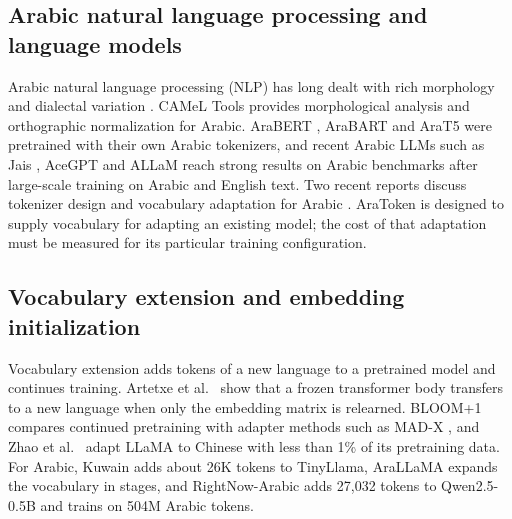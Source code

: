 \documentclass{ieeeaccess}
\begin{document}
\subsection{Arabic natural language processing and language models}

Arabic natural language processing (NLP) has long dealt with rich morphology and dialectal variation
\cite{darwish2021panoramic}. CAMeL Tools \cite{obeid2020camel} provides
morphological analysis and orthographic normalization for Arabic. AraBERT
\cite{antoun2020arabert}, AraBART \cite{kamal2021arabart} and AraT5
\cite{nagoudi2022arat5} were pretrained with their own Arabic tokenizers, and
recent Arabic LLMs such as Jais \cite{sengupta2023jais}, AceGPT
\cite{huang2023acegpt} and ALLaM \cite{bari2025allam} reach strong results on
Arabic benchmarks after large-scale training on Arabic and English text. Two
recent reports discuss tokenizer design and vocabulary adaptation for Arabic
\cite{tahakom_2025, kuwain_2025}. AraToken is designed to supply vocabulary
for adapting an existing model; the cost of that adaptation must be measured
for its particular training configuration.

\subsection{Vocabulary extension and embedding initialization}

Vocabulary extension adds tokens of a new language to a pretrained model and
continues training. Artetxe et al.\ \cite{artetxe2020cross} show that a frozen
transformer body transfers to a new language when only the embedding matrix
is relearned. BLOOM+1 \cite{yong2023bloom} compares continued pretraining with
adapter methods such as MAD-X \cite{pfeiffer2020mad}, and Zhao et al.\
\cite{zhao2024llama} adapt LLaMA to Chinese with less than 1\% of its
pretraining data. For Arabic, Kuwain \cite{kuwain_2025} adds about 26K tokens
to TinyLlama, AraLLaMA \cite{arallama_2024} expands the vocabulary in stages,
and RightNow-Arabic \cite{rightnow_2026} adds 27{,}032 tokens to
Qwen2.5-0.5B and trains on 504M Arabic tokens.
\end{document}

